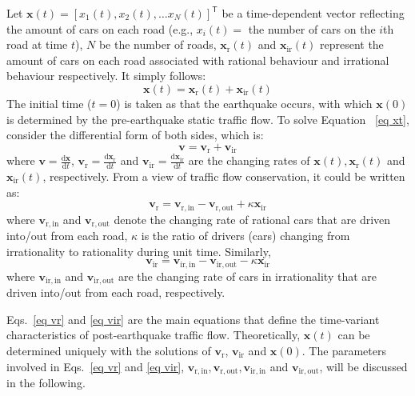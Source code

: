 \documentclass[review,11pt,nonatbib]{elsarticle}
\begin{document}
\par Let $\mathbf{x}(t) = [x_1(t),x_2(t),\ldots x_N(t)]^{\textsf{T}}$ be a time-dependent vector reflecting the amount of cars on each road (e.g., $x_i(t) = $ the number of cars on the $i$th road at time $t$),  $N$ be the number of roads, $\mathbf{x}_{\mathrm{r}}(t)$ and $\mathbf{x}_{\mathrm{ir}}(t)$ represent the amount of cars on each road associated with rational behaviour and irrational behaviour respectively. It simply follows:
\begin{equation}\label{eq xt}
\mathbf{x}(t)=\mathbf{x}_{\mathrm{r}}(t)+\mathbf{x}_{\mathrm{ir}}(t)
\end{equation}
The initial time ($t=0$) is taken as that the earthquake occurs, with which $\mathbf{x}(0)$ is determined by the pre-earthquake static traffic flow. To solve Equation ~\eqref{eq xt}, consider the differential form of both sides, which is:
\begin{equation}
\mathbf{v} = \mathbf{v}_{\mathrm{r}} + \mathbf{v}_{\mathrm{ir}}
\end{equation}
where $\mathbf{v} = \frac{\mathrm{d}\mathbf{x}}{\mathrm{d}t}$, $\mathbf{v}_{\mathrm{r}} = \frac{\mathrm{d}\mathbf{x}_{\mathrm{r}}}{\mathrm{d}t}$ and $ \mathbf{v}_{\mathrm{ir}} = \frac{\mathrm{d}\mathbf{x}_{\mathrm{ir}}}{\mathrm{d}t}$ are the changing rates of $\mathbf{x}(t), \mathbf{x}_{\mathrm{r}}(t)$ and $\mathbf{x}_{\mathrm{ir}}(t)$, respectively. From a view of traffic flow conservation, it could be written as:
\begin{equation}\label{eq vr}
\mathbf{v}_{\mathrm{r}}  = \mathbf{v}_{\mathrm{r,in}} - \mathbf{v}_{\mathrm{r,out}} + \kappa \mathbf{x}_{\mathrm{ir}}
\end{equation}
where $\mathbf{v}_{\mathrm{r,in}} $ and $\mathbf{v}_{\mathrm{r,out}}$ denote the changing rate of rational cars that are driven into/out from each road, $\kappa$ is the ratio of drivers (cars) changing from irrationality to rationality during unit time. Similarly,
\begin{equation}\label{eq vir}
\mathbf{v}_{\mathrm{ir}}  = \mathbf{v}_{\mathrm{ir,in}} - \mathbf{v}_{\mathrm{ir,out}} - \kappa \mathbf{x}_{\mathrm{ir}}
\end{equation}
where $\mathbf{v}_{\mathrm{ir,in}} $ and $\mathbf{v}_{\mathrm{ir,out}}$ are the changing rate of cars in irrationality that are driven into/out from each road, respectively.
\par Eqs.~\eqref{eq vr} and \eqref{eq vir} are the main equations that define the time-variant characteristics of post-earthquake traffic flow. Theoretically, $\mathbf{x}(t)$ can be determined uniquely with the solutions of $\mathbf{v}_{\mathrm{r}}$, $\mathbf{v}_{\mathrm{ir}}$ and $\mathbf{x}(0)$. The parameters involved in Eqs.~\eqref{eq vr} and \eqref{eq vir}, $\mathbf{v}_{\mathrm{r,in}}, \mathbf{v}_{\mathrm{r,out}},\mathbf{v}_{\mathrm{ir,in}}$ and $\mathbf{v}_{\mathrm{ir,out}}$, will be discussed in the following.
\end{document}
